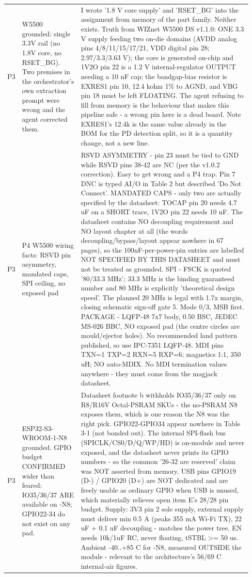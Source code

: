 \documentclass[11pt,a4paper]{article}
\begin{document}
{\begin{longtable}{lp{5.2cm}p{7.2cm}}
P3 & W5500 grounded: single 3.3V rail (no 1.8V core, no RSET\_BG). Two premises in the orchestrator's own extraction prompt were wrong and the agent corrected them. & I wrote '1.8 V core supply' and 'RSET\_BG' into the assignment from memory of the part family. Neither exists. Truth from WIZnet W5500 DS v1.1.0: ONE 3.3 V supply feeding two on-die domains (AVDD analog pins 4/8/11/15/17/21, VDD digital pin 28; 2.97/3.3/3.63 V); the core is generated on-chip and 1V2O pin 22 is a 1.2 V internal-regulator OUTPUT needing a 10 nF cap; the bandgap-bias resistor is EXRES1 pin 10, 12.4 kohm 1\% to AGND, and VBG pin 18 must be left FLOATING. The agent refusing to fill from memory is the behaviour that makes this pipeline safe - a wrong pin here is a dead board. Note EXRES1's 12.4k is the same value already in the BOM for the PD detection split, so it is a quantity change, not a new line. \\
P3 & P4 W5500 wiring facts: RSVD pin asymmetry, mandated caps, SPI ceiling, no exposed pad & RSVD ASYMMETRY - pin 23 must be tied to GND while RSVD pins 38-42 are NC (per the v1.0.2 correction). Easy to get wrong and a P4 trap. Pin 7 DNC is typed AI/O in Table 2 but described 'Do Not Connect'. MANDATED CAPS - only two are actually specified by the datasheet: TOCAP pin 20 needs 4.7 uF on a SHORT trace, 1V2O pin 22 needs 10 nF. The datasheet contains NO decoupling requirement and NO layout chapter at all (the words decoupling/bypass/layout appear nowhere in 67 pages), so the 100nF-per-power-pin entries are labelled NOT SPECIFIED BY THIS DATASHEET and must not be treated as grounded. SPI - FSCK is quoted '80/33.3 MHz'; 33.3 MHz is the binding guaranteed number and 80 MHz is explicitly 'theoretical design speed'. The planned 20 MHz is legal with 1.7x margin, closing schematic sign-off gate 5. Mode 0/3, MSB first. PACKAGE - LQFP-48 7x7 body, 0.50 BSC, JEDEC MS-026 BBC, NO exposed pad (the centre circles are mould/ejector holes). No recommended land pattern published, so use IPC-7351 LQFP-48. MDI pins TXN=1 TXP=2 RXN=5 RXP=6; magnetics 1:1, 350 uH; NO auto-MDIX. No MDI termination values anywhere - they must come from the magjack datasheet. \\
P3 & ESP32-S3-WROOM-1-N8 grounded. GPIO budget CONFIRMED wider than feared: IO35/36/37 ARE available on -N8; GPIO22-34 do not exist on any pad. & Datasheet footnote b withholds IO35/36/37 only on R8/R16V Octal-PSRAM SKUs - the no-PSRAM N8 exposes them, which is one reason the N8 was the right pick. GPIO22-GPIO34 appear nowhere in Table 3-1 (not bonded out). The internal SPI-flash bus (SPICLK/CS0/D/Q/WP/HD) is on-module and never exposed, and the datasheet never prints its GPIO numbers - so the common '26-32 are reserved' claim was NOT asserted from memory. USB pins GPIO19 (D-) / GPIO20 (D+) are NOT dedicated and are freely usable as ordinary GPIO when USB is unused, which materially relieves open item E's 28/28 pin budget. Supply: 3V3 pin 2 sole supply, external supply must deliver min 0.5 A (peaks 355 mA Wi-Fi TX), 22 uF + 0.1 uF decoupling - matches the power tree. EN needs 10k/1uF RC, never floating, tSTBL \textgreater{}= 50 us. Ambient -40..+85 C for -N8, measured OUTSIDE the module - relevant to the architecture's 56/69 C internal-air figures. \\

\end{longtable}}
\end{document}
